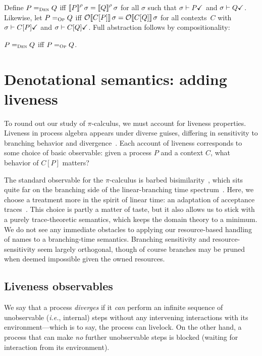 \documentclass{entcs}
\begin{document}
Define $P =_{\textsc{Den}} Q$ iff $\left\llbracket P \right\rrbracket^{\rho}\sigma =
\left\llbracket Q \right\rrbracket^{\rho}\sigma$ for all $\sigma$ such that $\sigma \vdash P\checkmark$
and $\sigma \vdash Q\checkmark$.  Likewise, let $P =_{\textsc{Op}} Q$ iff
$\mathcal{O}\!\left\llbracket C[P] \right\rrbracket\sigma = \mathcal{O}\!\left\llbracket C[Q] \right\rrbracket\sigma$ for all  contexts~$C$
with $\sigma \vdash C[P]\checkmark$ and $\sigma \vdash C[Q]\checkmark$.
Full abstraction follows by compositionality:

\begin{theorem}
  $P =_{\textsc{Den}} Q$ iff $P =_{\textsc{Op}} Q$.
\end{theorem}

\section{Denotational semantics: adding liveness}
\label{sec:liveness}

To round out our study of $\pi$-calculus, we must account for liveness
properties.  Liveness in process algebra appears under diverse guises,
differing in sensitivity to branching behavior and
divergence~\cite{Glabbeek1988}.  Each account of liveness corresponds
to some choice of basic observable: given a process $P$ and a context
$C$, what behavior of $C[P]$ matters?  

The standard observable for the $\pi$-calculus is barbed
bisimilarity~\cite{barbed}, which sits quite far on the branching side
of the linear-branching time spectrum~\cite{Glabbeek1988}.  Here, we
choose a treatment more in the spirit of linear time: an adaptation of
acceptance traces~\cite{Hennessy2002}.  This choice is partly a matter
of taste, but it also allows us to stick with a purely trace-theoretic
semantics, which keeps the domain theory to a minimum.  We do not see
any immediate obstacles to applying our resource-based handling of
names to a branching-time semantics.  Branching sensitivity and
resource-sensitivity seem largely orthogonal, though of course
branches may be pruned when deemed impossible given the owned
resources.

\subsection{Liveness observables}

We say that a process \emph{diverges} if it \emph{can} perform an
infinite sequence of unobservable (\emph{i.e.}, internal) steps
without any intervening interactions with its environment---which is
to say, the process can livelock.  On the other hand, a process that
can make \emph{no} further unobservable steps is blocked (waiting for
interaction from its environment).
\end{document}
